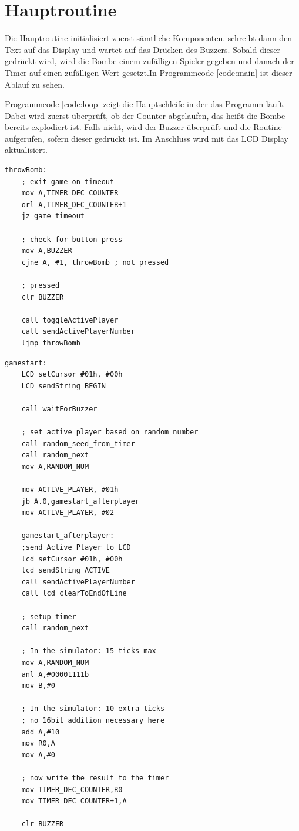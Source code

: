 \clearpage
\section{Hauptroutine}

Die Hauptroutine initialisiert zuerst sämtliche Komponenten.  schreibt dann den  Text auf das Display und wartet auf das Drücken des Buzzers. Sobald dieser gedrückt wird, wird die Bombe einem zufälligen Spieler gegeben und danach der Timer auf einen zufälligen Wert gesetzt.In Programmcode \ref{code:main} ist dieser Ablauf zu sehen.

Programmcode \ref{code:loop} zeigt die Hauptschleife in der das Programm läuft. Dabei wird zuerst überprüft, ob der Counter abgelaufen, das heißt die Bombe bereits explodiert ist. Falls nicht, wird der Buzzer überprüft und die  Routine aufgerufen, sofern dieser gedrückt ist. Im Anschluss wird mit  das LCD Display aktualisiert.

\noindent
\begin{minipage}[th]{\textwidth}
	\vspace{1em}
	\begin{lstlisting}[caption=Quellcode-Ausschnitt: Hauptschleife, label=code:loop]
	throwBomb:
	; exit game on timeout
	mov A,TIMER_DEC_COUNTER
	orl A,TIMER_DEC_COUNTER+1
	jz game_timeout

	; check for button press
	mov A,BUZZER
	cjne A, #1, throwBomb ; not pressed

	; pressed
	clr BUZZER

	call toggleActivePlayer
	call sendActivePlayerNumber
	ljmp throwBomb
	\end{lstlisting}
\end{minipage}

\noindent
\begin{minipage}[th]{\textwidth}
	\vspace{1em}
	\begin{lstlisting}[caption=Quellcode-Ausschnitt für die Hauptroutine, label=code:main]
	gamestart:
	LCD_setCursor #01h, #00h
	LCD_sendString BEGIN
	
	call waitForBuzzer
	
	; set active player based on random number
	call random_seed_from_timer
	call random_next
	mov A,RANDOM_NUM
	
	mov ACTIVE_PLAYER, #01h
	jb A.0,gamestart_afterplayer
	mov ACTIVE_PLAYER, #02
	
	gamestart_afterplayer:
	;send Active Player to LCD
	lcd_setCursor #01h, #00h
	lcd_sendString ACTIVE	
	call sendActivePlayerNumber
	call lcd_clearToEndOfLine
	
	; setup timer
	call random_next
	
	; In the simulator: 15 ticks max
	mov A,RANDOM_NUM
	anl A,#00001111b
	mov B,#0
	
	; In the simulator: 10 extra ticks
	; no 16bit addition necessary here
	add A,#10
	mov R0,A
	mov A,#0
	
	; now write the result to the timer
	mov TIMER_DEC_COUNTER,R0
	mov TIMER_DEC_COUNTER+1,A
	
	clr BUZZER
	\end{lstlisting}
\end{minipage}
